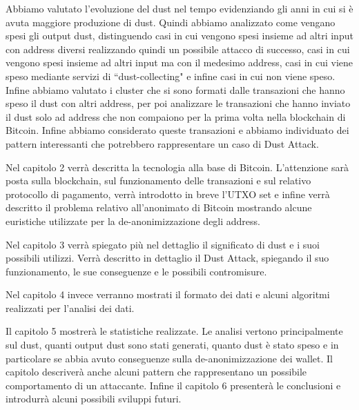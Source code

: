 Abbiamo valutato l'evoluzione del dust nel tempo evidenziando gli anni in cui si è avuta maggiore produzione di dust. Quindi abbiamo analizzato come vengano spesi gli output dust, distinguendo casi in cui vengono spesi insieme ad altri input con address diversi realizzando quindi un possibile attacco di successo, casi in cui vengono spesi insieme ad altri input ma con il medesimo address, casi in cui viene speso mediante servizi di ``dust-collecting" e infine casi in cui non viene speso. Infine abbiamo valutato i cluster che si sono formati dalle transazioni che hanno speso il dust con altri address, per poi analizzare le transazioni che hanno inviato il dust solo ad address che non compaiono per la prima volta nella blockchain di Bitcoin. Infine abbiamo considerato queste transazioni e abbiamo individuato dei pattern interessanti che potrebbero rappresentare un caso di Dust Attack.
 
Nel capitolo 2 verrà descritta la tecnologia alla base di Bitcoin. L'attenzione sarà posta sulla blockchain, sul funzionamento delle transazioni e sul relativo protocollo di pagamento, verrà introdotto in breve l'UTXO set e infine verrà descritto il problema relativo all'anonimato di Bitcoin mostrando alcune euristiche utilizzate per la de-anonimizzazione degli address.

Nel capitolo 3 verrà spiegato più nel dettaglio il significato di dust e i suoi possibili utilizzi. Verrà descritto in dettaglio il Dust Attack, spiegando il suo funzionamento, le sue conseguenze e le possibili contromisure.

Nel capitolo 4 invece verranno mostrati il formato dei dati e alcuni algoritmi realizzati per l'analisi dei dati.

Il capitolo 5 mostrerà le statistiche realizzate. Le analisi vertono principalmente sul dust, quanti output dust sono stati generati, quanto dust è stato speso e in particolare se abbia avuto conseguenze sulla de-anonimizzazione dei wallet. Il  capitolo  descriverà anche alcuni pattern che rappresentano un possibile comportamento di un attaccante. Infine il capitolo 6 presenterà le conclusioni e introdurrà alcuni possibili sviluppi futuri.